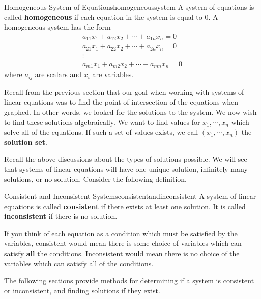 \begin{definition}{Homogeneous System of Equations}{homogeneoussystem}
A system of equations is called \textbf{homogeneous}  if each equation in
the system  is equal to $0$. A homogeneous system has the form 
\begin{equation*}
\begin{array}{c}
a_{11}x_{1}+a_{12}x_{2}+\cdots +a_{1n}x_{n}= 0 \\
a_{21}x_{1}+a_{22}x_{2}+\cdots +a_{2n}x_{n}= 0  \\
\vdots \\
a_{m1}x_{1}+a_{m2}x_{2}+\cdots +a_{mn}x_{n}= 0 
\end{array}
\end{equation*}
where $a_{ij}$ are scalars and $x_{i}$ are variables.
\end{definition}

Recall from the previous section that our goal when working with systems of linear equations 
was to find the point of intersection of the equations when graphed. In other words, we 
looked for the solutions to the system. We now wish to find these solutions algebraically. We want to find values for  
$ x_{1},\cdots ,x_{n} $ which solve all of
the equations. If such a set of values exists,  we call $\left( x_{1},\cdots ,x_{n}\right)$  the \textbf{solution set}.  

Recall the above discussions about the types of solutions possible. 
We will see that systems of linear equations will have one unique solution, infinitely many solutions, 
or no solution.  Consider the following definition. 

\begin{definition}{Consistent and Inconsistent Systems}{consistentandinconsistent}
A system of linear equations is called
 \textbf{consistent} if there exists at least one solution. It is
called
 \textbf{inconsistent }if there is no solution.
\end{definition}

If you think of each equation as a condition which must
be satisfied by the variables, consistent would mean there is some choice of
variables which can satisfy \textbf{all} the conditions. Inconsistent would mean
there is no choice of the variables which can satisfy all of the conditions.

The following sections provide methods for determining if a system is consistent or inconsistent, and finding
solutions if they exist.